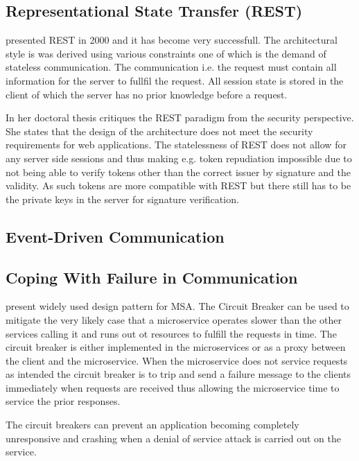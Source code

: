 \subsection{Representational State Transfer (REST)}
\begin{sloppypar}
    \citet{restroy} presented REST in 2000 and it has become very successfull. 
    The architectural style is was derived using various constraints one of 
    which is the demand of stateless communication. The communication i.e. 
    the request must contain all information for the server to fullfil the request. 
    All session state is stored in the client of which the server has no prior 
    knowledge before a request.
\end{sloppypar}
\begin{sloppypar}
    In her doctoral thesis \citet{secchalmsa} critiques the REST paradigm from 
    the security perspective. She states that the design of the architecture 
    does not meet the security requirements for web applications. The 
    statelessness of REST does not allow for any server side sessions and thus 
    making e.g. token repudiation impossible due to not being able to verify 
    tokens other than the correct issuer by signature and the validity. As such 
    tokens are more compatible with REST but there still has to be the private 
    keys in the server for signature verification.
\end{sloppypar}

\subsection{Event-Driven Communication}
\begin{sloppypar}
\end{sloppypar}

\subsection{Coping With Failure in Communication}
\begin{sloppypar}
    \citet{DBLP:journals/corr/MontesiW16} present widely used design pattern for MSA.
    The Circuit Breaker can be used to mitigate the very likely case that a 
    microservice operates slower than the other services calling it and 
    runs out ot resources to fulfill the requests in time. The circuit breaker
    is either implemented in the microservices or as a proxy between the client 
    and the microservice. When the microservice does not service requests as 
    intended the circuit breaker is to trip and send a failure message to the 
    clients immediately when requests are received thus allowing the 
    microservice time to service the prior responses.
\end{sloppypar}
\begin{sloppypar}
    The circuit breakers can prevent an application becoming completely 
    unresponsive and crashing when a denial of service attack is carried out on 
    the service.
\end{sloppypar}


